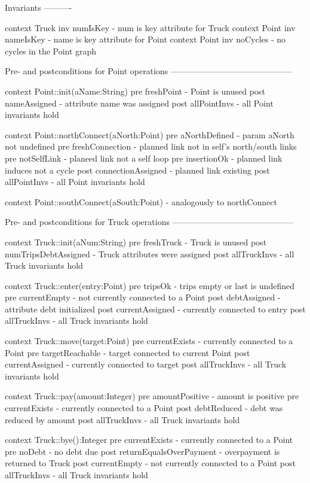 Invariants
----------

context Truck inv numIsKey  - num is key attribute for Truck
context Point inv nameIsKey - name is key attribute for Point
context Point inv noCycles  - no cycles in the Point graph

Pre- and postconditions for Point operations
--------------------------------------------

context Point::init(aName:String)
pre  freshPoint   - Point is unused
post nameAssigned - attribute name was assigned
post allPointInvs - all Point invariants hold

context Point::northConnect(aNorth:Point)
pre  aNorthDefined      - param aNorth not undefined
pre  freshConnection    - planned link not in self's north/south links
pre  notSelfLink        - planeed link not a self loop
pre  insertionOk        - planned link induces not a cycle
post connectionAssigned - planned link existing
post allPointInvs       - all Point invariants hold

context Point::southConnect(aSouth:Point)
- analogously to northConnect

Pre- and postconditions for Truck operations
--------------------------------------------

context Truck::init(aNum:String)
pre  freshTruck           - Truck is unused
post numTripsDebtAssigned - Truck attributes were assigned
post allTruckInvs         - all Truck invariants hold

context Truck::enter(entry:Point)
pre  tripsOk         - trips empty or last is undefined
pre  currentEmpty    - not currently connected to a Point
post debtAssigned    - attribute debt initialized
post currentAssigned - currently connected to entry
post allTruckInvs    - all Truck invariants hold

context Truck::move(target:Point)
pre  currentExists   - currently connected to a Point
pre  targetReachable - target connected to current Point
post currentAssigned - currently connected to target
post allTruckInvs    - all Truck invariants hold

context Truck::pay(amount:Integer)
pre  amountPositive - amount is positive
pre  currentExists  - currently connected to a Point
post debtReduced    - debt was reduced by amount
post allTruckInvs   - all Truck invariants hold

context Truck::bye():Integer
pre  currentExists           - currently connected to a Point
pre  noDebt                  - no debt due
post returnEqualsOverPayment - overpayment is returned to Truck
post currentEmpty            - not currently connected to a Point
post allTruckInvs            - all Truck invariants hold
